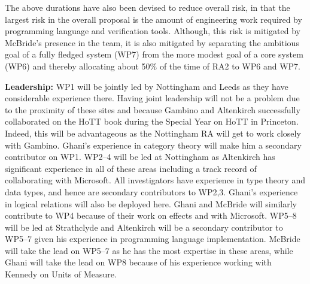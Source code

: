 \documentclass[a4paper,11pt]{article}
\begin{document}
The above durations have also been devised to reduce overall risk, in
that the largest risk in the overall proposal is the amount of
engineering work required by programming language and verification
tools. Although, this risk is mitigated by McBride's presence in the
team, it is also mitigated by separating the ambitious goal of a fully
fledged system (WP7) from the more modest goal of a core system (WP6)
and thereby allocating about 50$\%$ of the time of RA2 to WP6 and
WP7.






{\bf Leadership:} WP1 will be jointly led by Nottingham and Leeds as
they have considerable experience there. Having joint leadership will
not be a problem due to the proximity of these sites and because Gambino
and Altenkirch successfully collaborated on the HoTT book during the
Special Year on HoTT in Princeton. Indeed, this will be advantageous
as the Nottingham RA will get to work closely with Gambino. Ghani's
experience in category theory will make him a secondary contributor on
WP1. WP2--4 will be led at Nottingham as Altenkirch has significant
experience in all of these areas including a track record of
collaborating with Microsoft. All investigators have experience in
type theory and data types, and hence are secondary contributors to
WP2,3. Ghani's experience in logical relations will also be deployed
here. Ghani and McBride will similarly contribute
to WP4 because of their work on effects and with Microsoft. WP5--8
will be led at Strathclyde and Altenkirch will be a secondary
contributor to WP5--7 given his experience in programming language
implementation. McBride will take the lead on WP5--7 as he has the
most expertise in these areas, while Ghani will take the lead on WP8
because of his experience working with Kennedy on Units of Measure.
\end{document}
